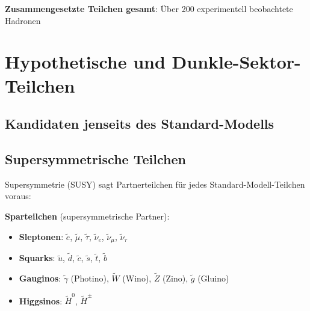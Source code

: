 	\textbf{Zusammengesetzte Teilchen gesamt}: Über 200 experimentell beobachtete Hadronen
	
	\section{Hypothetische und Dunkle-Sektor-Teilchen}
	
	\subsection{Kandidaten jenseits des Standard-Modells}
	
	\begin{table}[htbp]
		\centering
		\caption{Hypothetische Teilchen jenseits des Standard-Modells}
		\label{tab:hypothetical_particles}
	\end{table}
	
	\subsection{Supersymmetrische Teilchen}
	
	Supersymmetrie (SUSY) sagt Partnerteilchen für jedes Standard-Modell-Teilchen voraus:
	
	\textbf{Sparteilchen} (supersymmetrische Partner):
	\begin{itemize}
		\item \textbf{Sleptonen}: $\tilde{e}$, $\tilde{\mu}$, $\tilde{\tau}$, $\tilde{\nu}_e$, $\tilde{\nu}_\mu$, $\tilde{\nu}_\tau$
		\item \textbf{Squarks}: $\tilde{u}$, $\tilde{d}$, $\tilde{c}$, $\tilde{s}$, $\tilde{t}$, $\tilde{b}$
		\item \textbf{Gauginos}: $\tilde{\gamma}$ (Photino), $\tilde{W}$ (Wino), $\tilde{Z}$ (Zino), $\tilde{g}$ (Gluino)
		\item \textbf{Higgsinos}: $\tilde{H}^0$, $\tilde{H}^{\pm}$
	\end{itemize}
	
